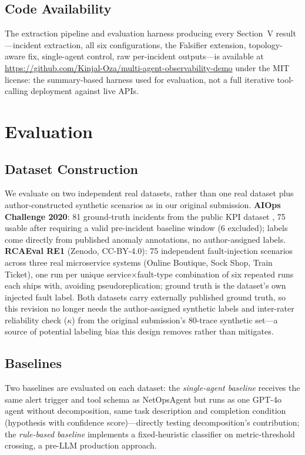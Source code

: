 \documentclass[10pt,conference]{IEEEtran}
\begin{document}
\subsection{Code Availability}
The extraction pipeline and evaluation harness producing every Section~V
result---incident extraction, all six configurations, the Falsifier
extension, topology-aware fix, single-agent control, raw per-incident
outputs---is available at
\url{https://github.com/Kinjal-Oza/multi-agent-observability-demo} under
the MIT license: the summary-based harness used for evaluation, not a full
iterative tool-calling deployment against live APIs.

\section{Evaluation}
\label{sec:eval}

\subsection{Dataset Construction}
We evaluate on two independent real datasets, rather than one real dataset
plus author-constructed synthetic scenarios as in our original submission.
\textbf{AIOps Challenge 2020}: 81 ground-truth incidents from the public KPI
dataset \cite{zhao2020aiops}, 75 usable after requiring a valid
pre-incident baseline window (6 excluded); labels come directly from
published anomaly annotations, no author-assigned labels. \textbf{RCAEval
RE1} (Zenodo, CC-BY-4.0): 75 independent fault-injection scenarios across
three real microservice systems (Online Boutique, Sock Shop, Train Ticket),
one run per unique service$\times$fault-type combination of six repeated
runs each ships with, avoiding pseudoreplication; ground truth is the
dataset's own injected fault label. Both datasets carry externally
published ground truth, so this revision no longer needs the
author-assigned synthetic labels and inter-rater reliability check
($\kappa$) \cite{cohen1960kappa} from the original submission's 80-trace
synthetic set---a source of potential labeling bias this design removes
rather than mitigates.

\subsection{Baselines}
Two baselines are evaluated on each dataset: the \emph{single-agent
baseline} receives the same alert trigger and tool schema as NetOpsAgent
but runs as one GPT-4o agent without decomposition, same task description
and completion condition (hypothesis with confidence score)---directly
testing decomposition's contribution; the \emph{rule-based baseline}
implements a fixed-heuristic classifier on metric-threshold crossing, a
pre-LLM production approach.
\end{document}
